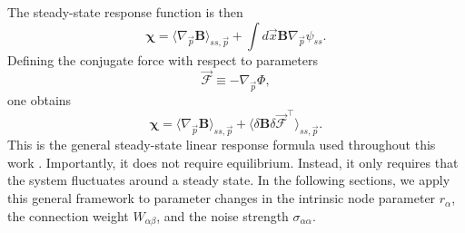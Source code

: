 The steady-state response function is then
\begin{equation}
    \boldsymbol{\chi} = \langle \nabla_{\vec{p}} \mathbf{B} \rangle_{ss, \vec{p}} + \int d\vec{x} \mathbf{B} \nabla_{\vec{p}} \psi_{ss}.
    \label{response_function}
\end{equation}
Defining the conjugate force with respect to parameters
\begin{equation}
    \vec{\mathscr{F}} \equiv -\nabla_{\vec{p}} \Phi,
    \label{conjugate_force}
\end{equation} 
one obtains
\begin{equation}
    \boldsymbol{\chi} = \langle \nabla_{\vec{p}} \mathbf{B} \rangle_{ss, \vec{p}} + \langle \delta \mathbf{B} \delta \vec{\mathscr{F}}^\intercal \rangle_{ss, \vec{p}}.
    \label{response_function2}
\end{equation}
This is the general steady-state linear response formula used throughout this work \cite{softmatter}. Importantly, it does not require equilibrium. Instead, it only requires that the system fluctuates around a steady state. In the following sections, we apply this general framework to parameter changes in the intrinsic node parameter $r_\alpha$, the connection weight $W_{\alpha\beta}$, and the noise strength $\sigma_{\alpha\alpha}$.
